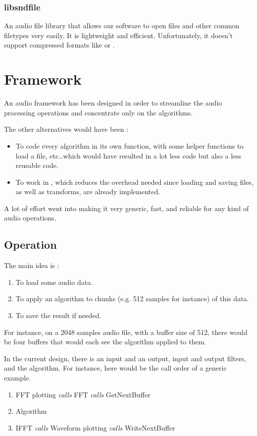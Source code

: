 \subsubsection{libsndfile}
An audio file library that allows our software to open  files and other common filetypes very easily. It is lightweight and efficient. Unfortunately, it doesn't support compressed formats like  or . 

\section{Framework}
An audio framework has been designed in order to streamline the audio processing operations and concentrate only on the algorithms.

The other alternatives would have been :
\begin{itemize}
\item To code every algorithm in its own function, with some helper functions to load a file, etc\dots which would have resulted in a lot less code but also a less reusable code.
\item To work in , which reduces the overhead needed since loading and saving files, as well as transforms, are already implemented.
\end{itemize}

A lot of effort went into making it very generic, fast, and reliable for any kind of audio operations.


\subsection{Operation}
The main idea is : 
\begin{enumerate}
\item To load some audio data.
\item To apply an algorithm to chunks (e.g. 512 samples for instance) of this data.
\item To save the result if needed.
\end{enumerate}

For instance, on a 2048 samples audio file, with a buffer size of 512, there would be four buffers that would each see the algorithm applied to them.

In the current design, there is an input and an output, input and output filters, and the algorithm. For instance, here would be the call order of a generic example.

\begin{enumerate}
\item FFT plotting \textit{calls} FFT \textit{calls} GetNextBuffer
\item Algorithm
\item IFFT \textit{calls} Waveform plotting \textit{calls} WriteNextBuffer
\end{enumerate}

